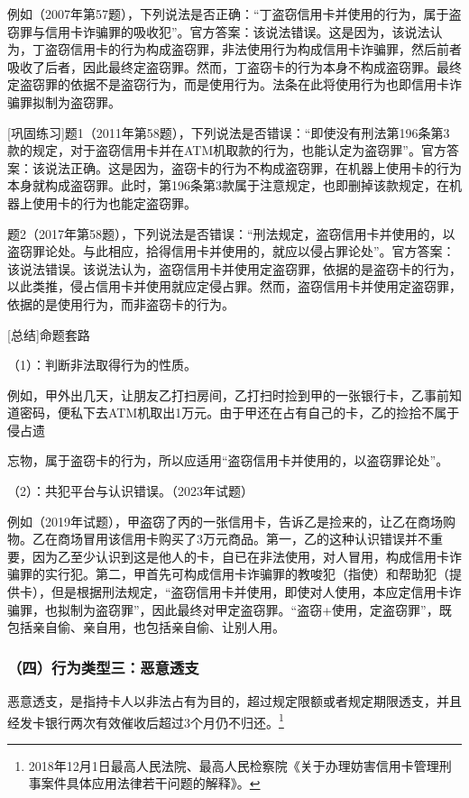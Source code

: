 例如（2007年第57题），下列说法是否正确：“丁盗窃信用卡并使用的行为，属于盗窃罪与信用卡诈骗罪的吸收犯”。官方答案：该说法错误。这是因为，该说法认为，丁盗窃信用卡的行为构成盗窃罪，非法使用行为构成信用卡诈骗罪，然后前者吸收了后者，因此最终定盗窃罪。然而，丁盗窃卡的行为本身不构成盗窃罪。最终定盗窃罪的依据不是盗窃行为，而是使用行为。法条在此将使用行为也即信用卡诈骗罪拟制为盗窃罪。

[巩固练习]题1（2011年第58题），下列说法是否错误：“即使没有刑法第196条第3款的规定，对于盗窃信用卡并在ATM机取款的行为，也能认定为盗窃罪”。官方答案：该说法正确。这是因为，盗窃卡的行为不构成盗窃罪，在机器上使用卡的行为本身就构成盗窃罪。此时，第196条第3款属于注意规定，也即删掉该款规定，在机器上使用卡的行为也能定盗窃罪。

题2（2017年第58题），下列说法是否错误：“刑法规定，盗窃信用卡并使用的，以盗窃罪论处。与此相应，拾得信用卡并使用的，就应以侵占罪论处”。官方答案：该说法错误。该说法认为，盗窃信用卡并使用定盗窃罪，依据的是盗窃卡的行为，以此类推，侵占信用卡并使用就应定侵占罪。然而，盗窃信用卡并使用定盗窃罪，依据的是使用行为，而非盗窃卡的行为。

[总结]命题套路

（1）：判断非法取得行为的性质。

例如，甲外出几天，让朋友乙打扫房间，乙打扫时捡到甲的一张银行卡，乙事前知道密码，便私下去ATM机取出1万元。由于甲还在占有自己的卡，乙的捡拾不属于侵占遗

忘物，属于盗窃卡的行为，所以应适用“盗窃信用卡并使用的，以盗窃罪论处”。

（2）：共犯平台与认识错误。（2023年试题）

例如（2019年试题），甲盗窃了丙的一张信用卡，告诉乙是捡来的，让乙在商场购物。乙在商场冒用该信用卡购买了3万元商品。第一，乙的这种认识错误并不重要，因为乙至少认识到这是他人的卡，自已在非法使用，对人冒用，构成信用卡诈骗罪的实行犯。第二，甲首先可构成信用卡诈骗罪的教唆犯（指使）和帮助犯（提供卡），但是根据刑法规定，“盗窃信用卡并使用，即使对人使用，本应定信用卡诈骗罪，也拟制为盗窃罪”，因此最终对甲定盗窃罪。“盗窃+使用，定盗窃罪”，既包括亲自偷、亲自用，也包括亲自偷、让别人用。

\subsubsection*{（四）行为类型三：恶意透支}

恶意透支，是指持卡人以非法占有为目的，超过规定限额或者规定期限透支，并且经发卡银行两次有效催收后超过3个月仍不归还。\footnote{2018年12月1日最高人民法院、最高人民检察院《关于办理妨害信用卡管理刑事案件具体应用法律若干问题的解释》。}

